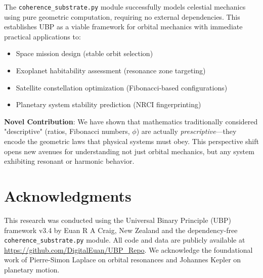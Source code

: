 \documentclass[12pt,a4paper]{article}
\begin{document}
The \texttt{coherence\_substrate.py} module successfully models celestial mechanics using pure geometric computation, requiring no external dependencies. This establishes UBP as a viable framework for orbital mechanics with immediate practical applications to:

\begin{itemize}
\item Space mission design (stable orbit selection)
\item Exoplanet habitability assessment (resonance zone targeting)
\item Satellite constellation optimization (Fibonacci-based configurations)
\item Planetary system stability prediction (NRCI fingerprinting)
\end{itemize}

\textbf{Novel Contribution}: We have shown that mathematics traditionally considered "descriptive" (ratios, Fibonacci numbers, $\phi$) are actually \textit{prescriptive}---they encode the geometric laws that physical systems must obey. This perspective shift opens new avenues for understanding not just orbital mechanics, but any system exhibiting resonant or harmonic behavior.

\section*{Acknowledgments}

This research was conducted using the Universal Binary Principle (UBP) framework v3.4 by Euan R A Craig, New Zealand and the dependency-free \texttt{coherence\_substrate.py} module. All code and data are publicly available at \url{https://github.com/DigitalEuan/UBP_Repo}. We acknowledge the foundational work of Pierre-Simon Laplace on orbital resonances and Johannes Kepler on planetary motion.
\end{document}
